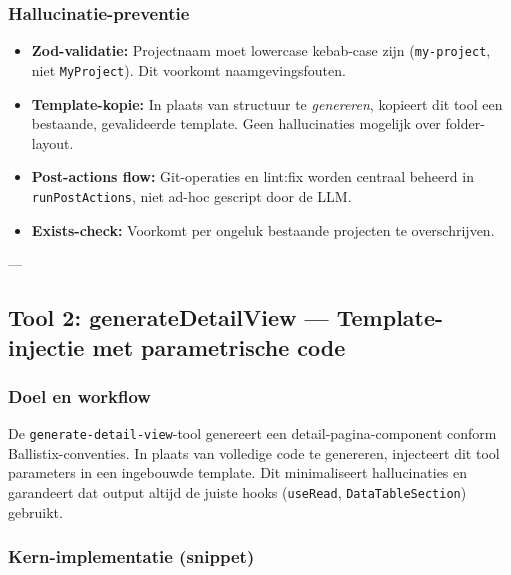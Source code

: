 \subsubsection{Hallucinatie-preventie}

\begin{itemize}
  \item \textbf{Zod-validatie:} Projectnaam moet lowercase kebab-case zijn (\texttt{my-project}, niet \texttt{MyProject}). Dit voorkomt naamgevingsfouten.
  \item \textbf{Template-kopie:} In plaats van structuur te \textit{genereren}, kopieert dit tool een bestaande, gevalideerde template. Geen hallucinaties mogelijk over folder-layout.
  \item \textbf{Post-actions flow:} Git-operaties en lint:fix worden centraal beheerd in \texttt{runPostActions}, niet ad-hoc gescript door de LLM.
  \item \textbf{Exists-check:} Voorkomt per ongeluk bestaande projecten te overschrijven.
\end{itemize}

---

\subsection{Tool 2: generateDetailView — Template-injectie met parametrische code}

\subsubsection{Doel en workflow}

De \texttt{generate-detail-view}-tool genereert een detail-pagina-component conform Ballistix-conventies. In plaats van volledige code te genereren, injecteert dit tool parameters in een ingebouwde template. Dit minimaliseert hallucinaties en garandeert dat output altijd de juiste hooks (\texttt{useRead}, \texttt{DataTableSection}) gebruikt.

\subsubsection{Kern-implementatie (snippet)}

